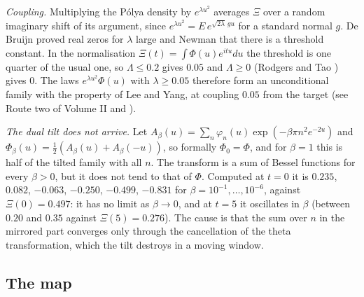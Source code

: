 \emph{Coupling.} Multiplying the P\'olya density by $e^{\lambda u^2}$ averages $\Xi$ over a random imaginary shift of its argument, since $e^{\lambda u^2}=E\,e^{\sqrt{2\lambda}\,gu}$ for a standard normal $g$. De Bruijn \cite{deBruijn} proved real zeros for $\lambda$ large and Newman \cite{Newman1976} that there is a threshold constant. In the normalisation $\Xi(t)=\int\Phi(u)e^{itu}du$ the threshold is one quarter of the usual one, so $\Lambda\le0.2$ \cite{PT21} gives $0.05$ and $\Lambda\ge0$ (Rodgers and Tao \cite{RodgersTao}) gives $0$. The laws $e^{\lambda u^2}\Phi(u)$ with $\lambda\ge0.05$ therefore form an unconditional family with the property of Lee and Yang, at coupling $0.05$ from the target (see Route two of Volume II and \cite{Polymath}).

\emph{The dual tilt does not arrive.} Let $A_\beta(u)=\sum_n\varphi_n(u)\exp(-\beta\pi n^2e^{-2u})$ and $\Phi_\beta(u)=\frac12(A_\beta(u)+A_\beta(-u))$, so formally $\Phi_0=\Phi$, and for $\beta=1$ this is half of the tilted family with all $n$. The transform is a sum of Bessel functions for every $\beta>0$, but it does not tend to that of $\Phi$. Computed at $t=0$ it is $0.235$, $0.082$, $-0.063$, $-0.250$, $-0.499$, $-0.831$ for $\beta=10^{-1},\dots,10^{-6}$, against $\Xi(0)=0.497$: it has no limit as $\beta\to0$, and at $t=5$ it oscillates in $\beta$ (between $0.20$ and $0.35$ against $\Xi(5)=0.276$). The cause is that the sum over $n$ in the mirrored part converges only through the cancellation of the theta transformation, which the tilt destroys in a moving window.

\subsection{The map}\label{lxi:sub:mapfam}

